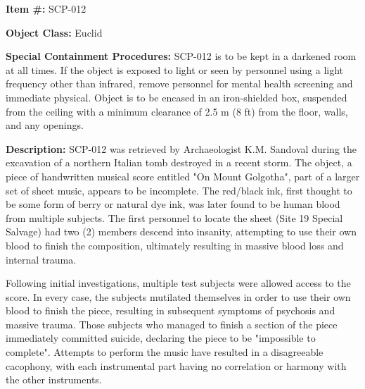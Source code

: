 
\textbf{Item \#:} SCP-012

\textbf{Object Class:} Euclid

\textbf{Special Containment Procedures:} SCP-012 is to be kept in a darkened room at all times. If the object is exposed to light or seen by personnel using a light frequency other than infrared, remove personnel for mental health screening and immediate physical. Object is to be encased in an iron-shielded box, suspended from the ceiling with a minimum clearance of 2.5 m (8 ft) from the floor, walls, and any openings.

\textbf{Description:} SCP-012 was retrieved by Archaeologist K.M. Sandoval during the excavation of a northern Italian tomb destroyed in a recent storm. The object, a piece of handwritten musical score entitled "On Mount Golgotha", part of a larger set of sheet music, appears to be incomplete. The red/black ink, first thought to be some form of berry or natural dye ink, was later found to be human blood from multiple subjects. The first personnel to locate the sheet (Site 19 Special Salvage) had two (2) members descend into insanity, attempting to use their own blood to finish the composition, ultimately resulting in massive blood loss and internal trauma.

Following initial investigations, multiple test subjects were allowed access to the score. In every case, the subjects mutilated themselves in order to use their own blood to finish the piece, resulting in subsequent symptoms of psychosis and massive trauma. Those subjects who managed to finish a section of the piece immediately committed suicide, declaring the piece to be "impossible to complete". Attempts to perform the music have resulted in a disagreeable cacophony, with each instrumental part having no correlation or harmony with the other instruments.